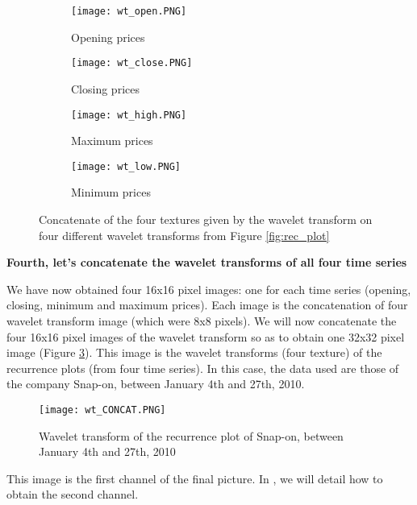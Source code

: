 \documentclass[11pt]{article}
\begin{document}
\begin{onehalfspace}
\begin{figure}[h!]
    \centering
    \captionsetup{justification=centering}
    \begin{subfigure}{0.24\textwidth}
        \texttt{[image: wt\_open.PNG]}
        \caption{Opening prices}
        \label{fig:open_concat}
    \end{subfigure}
    \begin{subfigure}{0.24\textwidth}
        \texttt{[image: wt\_close.PNG]}
        \caption{Closing prices}
    \end{subfigure}
    \begin{subfigure}{0.24\textwidth}
        \texttt{[image: wt\_high.PNG]}
        \caption{Maximum prices}
    \end{subfigure}    
    \begin{subfigure}{0.24\textwidth}
        \texttt{[image: wt\_low.PNG]}
        \caption{Minimum prices}
    \end{subfigure}
    \caption{Concatenate of the four textures given by the wavelet transform on four different wavelet transforms from Figure \ref{fig:rec_plot}}
    \label{fig:wave_concat}
\end{figure}

\noindent \textbf{Fourth, let's concatenate the wavelet transforms of all four time series }

We have now obtained four 16x16 pixel images: one for each time series (opening, closing, minimum and maximum prices). Each image is the concatenation of four wavelet transform image (which were 8x8 pixels). We will now concatenate the four 16x16 pixel images of the wavelet transform so as to obtain one 32x32 pixel image (Figure \ref{fig:wt}). This image is the wavelet transforms (four texture) of the recurrence plots (from four time series). In this case, the data used are those of the company Snap-on, between January 4th and 27th, 2010. 

\begin{figure}[h!]
     \centering
     \captionsetup{justification=centering}
     \texttt{[image: wt\_CONCAT.PNG]}
     \caption{Wavelet transform of the recurrence plot of Snap-on, between January 4th and 27th, 2010}
\label{fig:wt}
\end{figure}

This image is the first channel of the final picture. In , we will detail how to obtain the second channel.


\end{onehalfspace}
\end{document}
